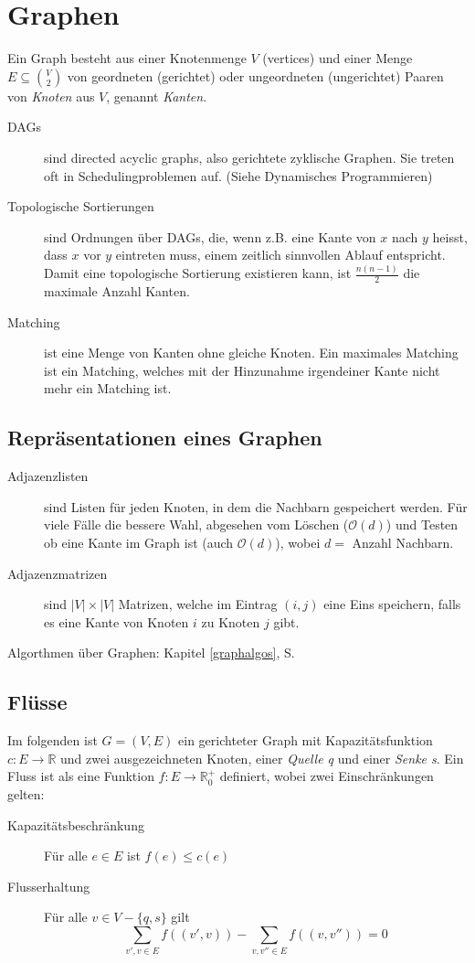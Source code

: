 \documentclass[a4paper, 9pt, DIV=20]{scrartcl}
\newcommand{\R}{\mathbb{R}}
\newcommand{\Oh}{\mathcal{O}}
\begin{document}
\section{Graphen}
Ein Graph besteht aus einer Knotenmenge $V$ (vertices) und einer Menge $E \subseteq {V \choose 2}$ von geordneten (gerichtet) oder ungeordneten (ungerichtet) Paaren von \emph{Knoten} aus $V$, genannt \emph{Kanten}.
\begin{description}
\item[DAGs] sind directed acyclic graphs, also gerichtete zyklische Graphen. Sie treten oft in Schedulingproblemen auf. (Siehe Dynamisches Programmieren)
\item[Topologische Sortierungen] sind Ordnungen über DAGs, die, wenn z.B. eine Kante von $x$ nach $y$ heisst, dass $x$ vor $y$ eintreten muss, einem zeitlich sinnvollen Ablauf entspricht. Damit eine topologische Sortierung existieren kann, ist $\frac{n(n-1)}{2}$ die maximale Anzahl Kanten.
\item[Matching] ist eine Menge von Kanten ohne gleiche Knoten. Ein maximales Matching ist ein Matching, welches mit der Hinzunahme irgendeiner Kante nicht mehr ein Matching ist.
\end{description}

\subsection{Repräsentationen eines Graphen}
\begin{description}
\item[Adjazenzlisten] sind Listen für jeden Knoten, in dem die Nachbarn gespeichert werden. Für viele Fälle die bessere Wahl, abgesehen vom Löschen ($\Oh(d)$) und Testen ob eine Kante im Graph ist (auch $\Oh(d)$), wobei $d=$ Anzahl Nachbarn.
\item[Adjazenzmatrizen] sind $|V|\times|V|$ Matrizen, welche im Eintrag $(i,j)$ eine Eins speichern, falls es eine Kante von Knoten $i$ zu Knoten $j$ gibt. 
\end{description}

Algorthmen über Graphen: Kapitel \ref{graphalgos}, S. \pageref{graphalgos}

\subsection{Flüsse}
Im folgenden ist $G=(V,E)$ ein gerichteter Graph mit Kapazitätsfunktion $c: E\to\R$ und zwei ausgezeichneten Knoten, einer \emph{Quelle q} und einer \emph{Senke s}. Ein Fluss ist als eine Funktion $f: E\to\R^{+}_{0}$ definiert, wobei zwei Einschränkungen gelten:
\begin{description}
\item[Kapazitätsbeschränkung]
Für alle $e\in E$ ist $f(e)\leq c(e)$
\item[Flusserhaltung]
Für alle $v\in V - \{q,s\}$ gilt \[ \sum_{v',v\in E}{f((v',v))}-\sum_{v,v''\in E}{f((v,v''))} = 0\]
\end{description}
\end{document}
